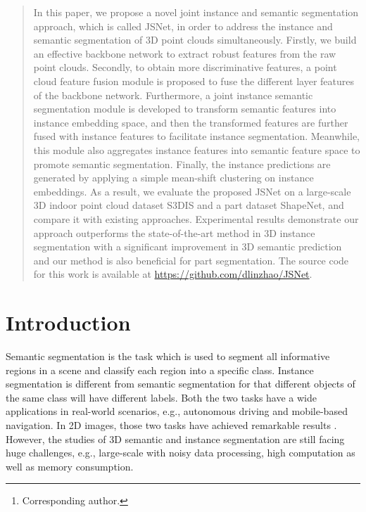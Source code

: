 \documentclass[letterpaper]{article} \usepackage{aaai20}  \usepackage{times}  \usepackage{helvet} \usepackage{courier}  \usepackage[hyphens]{url}  \usepackage{graphicx} \urlstyle{rm} \def\UrlFont{\rm}  \usepackage{graphicx}  \frenchspacing  \setlength{\pdfpagewidth}{8.5in}  \setlength{\pdfpageheight}{11in}
\author{Lin Zhao, Wenbing Tao\textsuperscript{}\thanks{Corresponding author.}\\
National Key Laboratory of Science and Technology on Multispectral Information Processing \\
School of Artifical Intelligence and Automation, Huazhong University of Science and Technology, China\\
\{linzhao, wenbingtao\}@hust.edu.cn }
\begin{document}
\maketitle

\begin{abstract}
In this paper, we propose a novel joint instance and semantic segmentation  approach, which is called JSNet, in order to address the instance and semantic segmentation of 3D point clouds simultaneously. Firstly, we build an  effective backbone network to extract robust features from the raw point clouds. Secondly, to obtain more discriminative features, a point cloud feature fusion module is proposed to fuse the different layer features of the backbone network. Furthermore, a joint instance semantic segmentation module is developed to transform semantic features into instance embedding space, and then the transformed features are further fused with instance features to facilitate instance segmentation. Meanwhile, this module also aggregates instance features into semantic feature space to promote semantic segmentation. Finally, the instance predictions are generated by applying a simple mean-shift clustering on instance embeddings. As a result, we evaluate the proposed JSNet on a large-scale 3D indoor point cloud dataset S3DIS and a part dataset ShapeNet, and compare it with existing approaches. Experimental results demonstrate our approach outperforms the state-of-the-art method in 3D instance segmentation with a significant improvement in 3D semantic prediction and our method is also beneficial for part segmentation. The source code for this work is available at \url{https://github.com/dlinzhao/JSNet}. 
\end{abstract}

\section{Introduction}
Semantic segmentation is the task which is used to segment all informative regions in a scene and classify each region into a specific class. Instance segmentation is different from semantic segmentation for that different objects of the same class will have different labels. Both the two tasks have a wide applications in real-world scenarios, e.g., autonomous driving and mobile-based navigation. In 2D images, those two tasks have achieved remarkable results \cite{deeplabv3plus2018,he2017mask,li2018attention}. However, the studies of 3D semantic and instance segmentation are still facing huge challenges, e.g., large-scale with noisy data processing, high computation as well as memory consumption.
\end{document}

